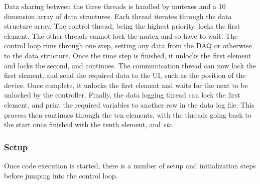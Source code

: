 \documentclass[12pt]{report}
\begin{document}
	Data sharing between the three threads is handled by mutexes and a 10 dimension array of data structures. Each thread iterates through the data structure array. The control thread, being the highest priority, locks the first element. The other threads cannot lock the mutex and so have to wait. The control loop runs through one step, setting any data from the DAQ or otherwise to the data structure. Once the time step is finished, it unlocks the first element and locks the second, and continues. The communication thread can now lock the first element, and send the required data to the UI, such as the position of the device. Once complete, it unlocks the first element and waits for the next to be unlocked by the controller. Finally, the data logging thread  can lock the first element, and print the required variables to another row in the data log file. This process then continues through the ten elements, with the threads going back to the start once finished with the tenth element, and \textit{etc}. 
	
	\subsubsection{Setup}
	
	Once code execution is started, there is a number of setup and initialization steps before jumping into the control loop. 
	
\end{document}
